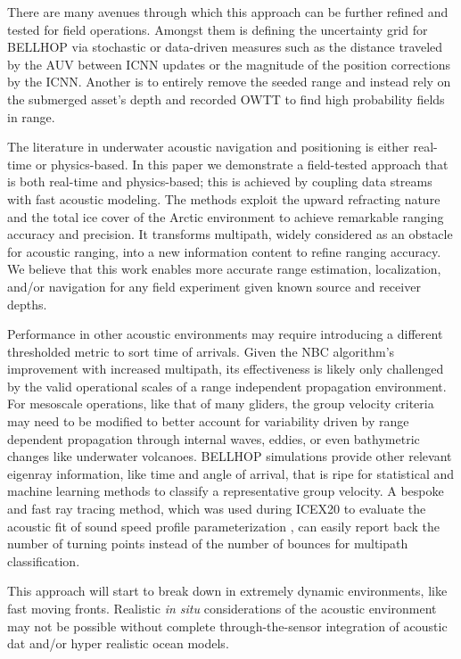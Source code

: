 There are many avenues through which this approach can be further refined and tested for field operations.
Amongst them is defining the uncertainty grid for BELLHOP via stochastic or data-driven measures such as the distance traveled by the AUV between ICNN updates or the magnitude of the position corrections by the ICNN.
Another is to entirely remove the seeded range and instead rely on the submerged asset's depth and recorded OWTT to find high probability fields in range.

The literature in underwater acoustic navigation and positioning is either real-time or physics-based.
In this paper we demonstrate a field-tested approach that is both real-time and physics-based; this is achieved by coupling data streams with fast acoustic modeling.
The methods exploit the upward refracting nature and the total ice cover of the Arctic environment to achieve remarkable ranging accuracy and precision.
It transforms multipath, widely considered as an obstacle for acoustic ranging, into a new information content to refine ranging accuracy.
We believe that this work enables more accurate range estimation, localization, and/or navigation for any field experiment given known source and receiver depths.

Performance in other acoustic environments may require introducing a different thresholded metric to sort time of arrivals.
Given the NBC algorithm's improvement with increased multipath, its effectiveness is likely only challenged by the valid operational scales of a range independent propagation environment.
For mesoscale operations, like that of many gliders, the group velocity criteria may need to be modified to better account for variability driven by range dependent propagation through internal waves, eddies, or even bathymetric changes like underwater volcanoes.
BELLHOP simulations provide other relevant eigenray information, like time and angle of arrival, that is ripe for statistical and machine learning methods to classify a representative group velocity.
A bespoke and fast ray tracing method, which was used during ICEX20 to evaluate the acoustic fit of sound speed profile parameterization \citep{bhatt_embedded_2022}, can easily report back the number of turning points instead of the number of bounces for multipath classification.

This approach will start to break down in extremely dynamic environments, like fast moving fronts.
Realistic \textit{in situ} considerations of the acoustic environment may not be possible without complete through-the-sensor integration of acoustic dat and/or hyper realistic ocean models.

